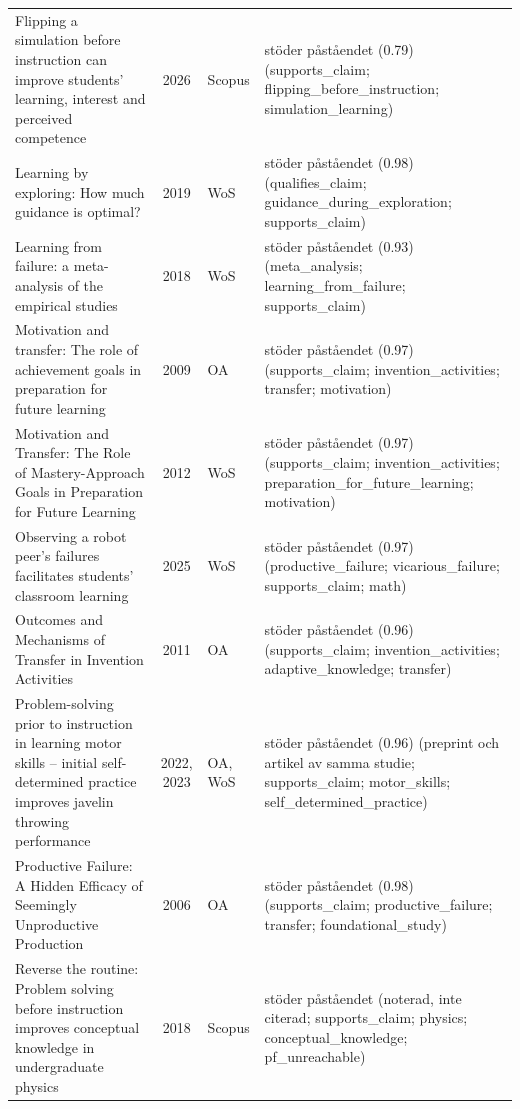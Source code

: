 \begin{longtable}{@{}%
  >{\raggedright\arraybackslash}p{}c%
  >{\raggedright\arraybackslash}p{}%
  >{\raggedright\arraybackslash\footnotesize}p{}@{}}
Flipping a simulation before instruction can improve students' learning, interest and perceived competence & 2026 & Scopus & stöder påståendet (0.79) (supports\_\allowbreak{}claim; flipping\_\allowbreak{}before\_\allowbreak{}instruction; simulation\_\allowbreak{}learning) \\
Learning by exploring: How much guidance is optimal? & 2019 & WoS & stöder påståendet (0.98) (qualifies\_\allowbreak{}claim; guidance\_\allowbreak{}during\_\allowbreak{}exploration; supports\_\allowbreak{}claim) \\
Learning from failure: a meta-analysis of the empirical studies & 2018 & WoS & stöder påståendet (0.93) (meta\_\allowbreak{}analysis; learning\_\allowbreak{}from\_\allowbreak{}failure; supports\_\allowbreak{}claim) \\
Motivation and transfer: The role of achievement goals in preparation for future learning & 2009 & OA & stöder påståendet (0.97) (supports\_\allowbreak{}claim; invention\_\allowbreak{}activities; transfer; motivation) \\
Motivation and Transfer: The Role of Mastery-Approach Goals in Preparation for Future Learning & 2012 & WoS & stöder påståendet (0.97) (supports\_\allowbreak{}claim; invention\_\allowbreak{}activities; preparation\_\allowbreak{}for\_\allowbreak{}future\_\allowbreak{}learning; motivation) \\
Observing a robot peer's failures facilitates students' classroom learning & 2025 & WoS & stöder påståendet (0.97) (productive\_\allowbreak{}failure; vicarious\_\allowbreak{}failure; supports\_\allowbreak{}claim; math) \\
Outcomes and Mechanisms of Transfer in Invention Activities & 2011 & OA & stöder påståendet (0.96) (supports\_\allowbreak{}claim; invention\_\allowbreak{}activities; adaptive\_\allowbreak{}knowledge; transfer) \\
Problem-solving prior to instruction in learning motor skills -- initial self-determined practice improves javelin throwing performance & 2022, 2023 & OA, WoS & stöder påståendet (0.96) (preprint och artikel av samma studie; supports\_\allowbreak{}claim; motor\_\allowbreak{}skills; self\_\allowbreak{}determined\_\allowbreak{}practice) \\
Productive Failure: A Hidden Efficacy of Seemingly Unproductive Production & 2006 & OA & stöder påståendet (0.98) (supports\_\allowbreak{}claim; productive\_\allowbreak{}failure; transfer; foundational\_\allowbreak{}study) \\
Reverse the routine: Problem solving before instruction improves conceptual knowledge in undergraduate physics & 2018 & Scopus & stöder påståendet (noterad, inte citerad; supports\_\allowbreak{}claim; physics; conceptual\_\allowbreak{}knowledge; pf\_\allowbreak{}unreachable) \\

\end{longtable}
